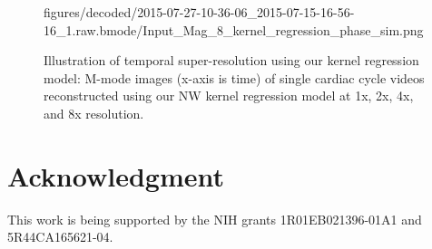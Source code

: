 \documentclass[journal]{IEEEtran}
\begin{document}
\begin{figure}[t]
{figures/decoded/2015-07-27-10-36-06_2015-07-15-16-56-16_1.raw.bmode/Input_Mag_8_kernel_regression_phase_sim.png}
%
\caption{Illustration of temporal super-resolution using our kernel regression model: M-mode images (x-axis is time) of single cardiac cycle videos reconstructed using our NW kernel regression model at 1x, 2x, 4x, and 8x resolution.}
\label{fig:superresolution}
\end{figure}
%	
%
%
\section*{Acknowledgment}
This work is being supported by the NIH grants 1R01EB021396-01A1 and 5R44CA165621-04. 
%


%
\end{document}
